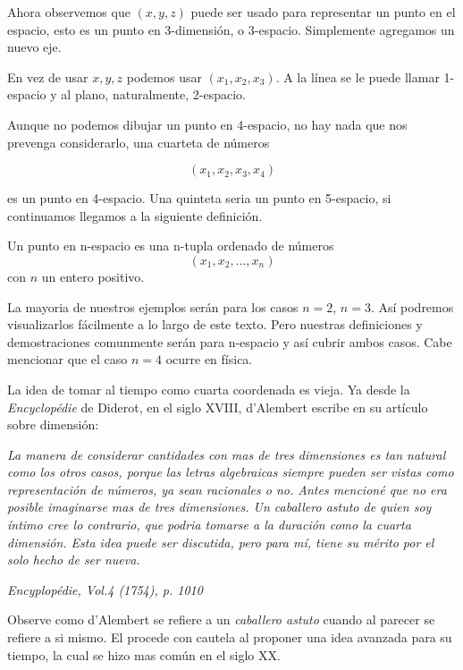 Ahora observemos que $(x,y,z)$ puede ser usado para representar un punto en el espacio, esto es un
punto en 3-dimensión, o 3-espacio. Simplemente agregamos un nuevo eje.

En vez de usar $x,y,z$ podemos usar $(x_{1},x_{2},x_{3})$. A la línea se le puede llamar 1-espacio y
al plano, naturalmente, 2-espacio.

Aunque no podemos dibujar un punto en 4-espacio, no hay nada que nos prevenga considerarlo, una cuarteta
de números

$$(x_{1},x_{2},x_{3},x_{4})$$

es un punto en 4-espacio. Una quinteta seria un punto en 5-espacio, si continuamos llegamos a la siguiente
definición.

\begin{definition}
    Un punto en n-espacio es una n-tupla ordenado de números
    $$ (x_{1},x_{2}, \ldots ,x_{n}) $$
    con $n$ un entero positivo.
\end{definition}

La mayoria de nuestros ejemplos serán para los casos $n=2$, $n=3$. Así podremos visualizarlos f\'acilmente a
lo largo de este texto. Pero nuestras definiciones y demostraciones comunmente serán para n-espacio y así
cubrir ambos casos. Cabe mencionar que el caso $n=4$ ocurre en física.

La idea de tomar al tiempo como cuarta coordenada es vieja. Ya desde la \emph{Encyclopédie} de Diderot, en
el siglo XVIII, d'Alembert escribe en su artículo sobre dimensión:

\vspace{0.5cm}

\emph{La manera de considerar cantidades con mas de tres dimensiones es tan natural como los otros casos,
porque las letras algebraicas siempre pueden ser vistas como representación de números, ya sean racionales
o no. Antes mencion\'e que no era posible imaginarse mas de tres dimensiones. Un caballero astuto de quien soy
íntimo cree lo contrario, que podria tomarse a la duración como la cuarta dimensión. Esta idea puede ser
discutida, pero para mí, tiene su mérito por el solo hecho de ser nueva.}

\begin{flushright}
    \emph{Encyplopédie, Vol.4 (1754), p. 1010}
\end{flushright}

Observe como d'Alembert se refiere a un \emph{caballero astuto} cuando al parecer se refiere a si mismo. El procede
con cautela al proponer una idea avanzada para su tiempo, la cual se hizo mas común en el siglo XX.

